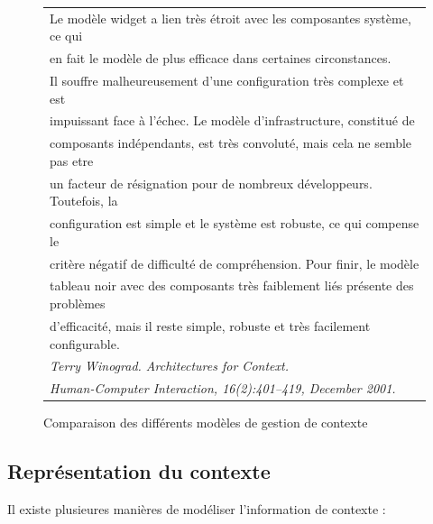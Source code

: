\begin{figure}[h]
  \centering
  \begin{tabular}{l}
    Le modèle widget a lien très étroit avec les composantes système, ce qui \\
    en fait le modèle de plus efficace dans certaines circonstances. \\
    Il souffre malheureusement d'une configuration très complexe et est \\
    impuissant face à l'échec. Le modèle d'infrastructure, constitué de \\
    composants indépendants, est très convoluté, mais cela ne semble pas etre \\
    un facteur de résignation pour de nombreux développeurs. Toutefois, la \\
    configuration est simple et le système est robuste, ce qui compense le \\
    critère négatif de difficulté de compréhension. Pour finir, le modèle \\
    tableau noir avec des composants très faiblement liés présente des problèmes \\
    d'efficacité, mais il reste simple, robuste et très facilement configurable.
    \cite{winograd_architectures_2001} \\
    \em \footnotesize Terry Winograd. Architectures for Context. \\
    \em \footnotesize Human-Computer Interaction, 16(2):401–419,
     December 2001. \\
  \end{tabular}
  \caption{Comparaison des différents modèles de gestion de contexte}
  \label{fig:quote}
\end{figure}

\subsection{Représentation du contexte}

Il existe plusieures manières de modéliser l'information de contexte :

